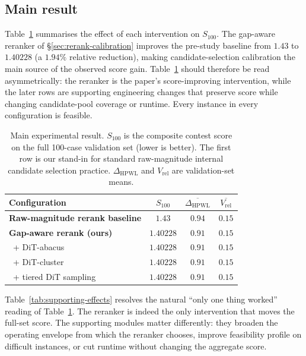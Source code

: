 \documentclass[nolineno]{ieeeaccess}
\begin{document}
\subsection{Main result}
\label{sec:exp-main}
Table~\ref{tab:main-result} summarises the effect of each intervention
on $S_{100}$. The gap-aware reranker of \S\ref{sec:rerank-calibration}
improves the pre-study baseline from $1.43$ to $\mathbf{1.40228}$
(a $1.94\%$ relative reduction), making candidate-selection calibration
the main source of the observed score gain. Table~\ref{tab:main-result}
should therefore be read asymmetrically: the reranker is the paper's
score-improving intervention, while the later rows are supporting
engineering changes that preserve score while changing candidate-pool
coverage or runtime. Every instance in every configuration is feasible.

\begin{table}[t]
\caption{Main experimental result. $S_{100}$ is the composite contest
score on the full 100-case validation set (lower is better). The first
row is our stand-in for standard raw-magnitude internal candidate
selection practice. $\Delta_{\text{HPWL}}$ and $V_{\text{rel}}$ are
validation-set means.}
\label{tab:main-result}
\centering
\footnotesize
\begin{tabular}{@{}lccc@{}}
\toprule
Configuration & $S_{100}$ & $\overline{\Delta_{\text{HPWL}}}$ & $\overline{V_{\text{rel}}}$\\
\midrule
\textbf{Raw-magnitude rerank baseline} & $1.43$ & $0.94$ & $0.15$\\
\textbf{Gap-aware rerank (ours)} & $\mathbf{1.40228}$ & $\mathbf{0.91}$ & $\mathbf{0.15}$\\
\ + DiT-abacus                & $1.40228$ & $0.91$ & $0.15$\\
\ + DiT-cluster               & $1.40228$ & $0.91$ & $0.15$\\
\ + tiered DiT sampling       & $1.40228$ & $0.91$ & $0.15$\\
\bottomrule
\end{tabular}
\end{table}

Table~\ref{tab:supporting-effects} resolves the natural
``only one thing worked'' reading of Table~\ref{tab:main-result}. The
reranker is indeed the only intervention that moves the full-set score.
The supporting modules matter differently: they broaden the operating
envelope from which the reranker chooses, improve feasibility profile
on difficult instances, or cut runtime without changing the aggregate
score.
\end{document}
